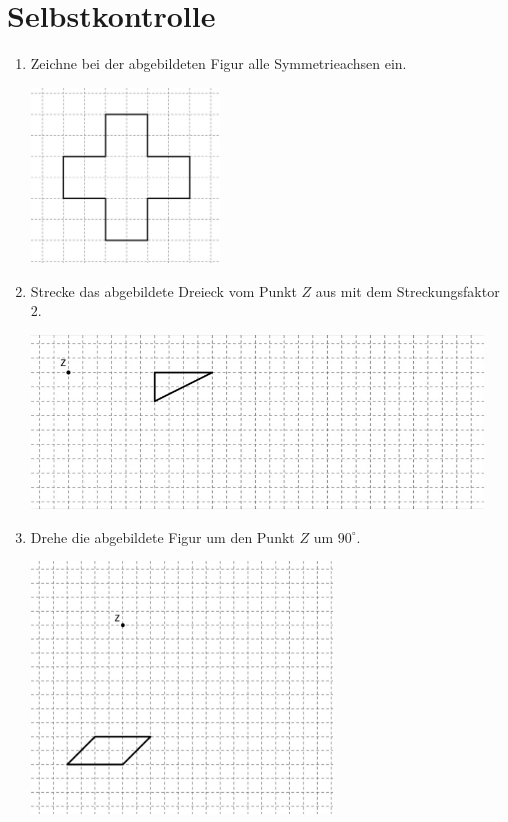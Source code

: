 \documentclass[%
11pt,%
twoside,%
titlepage,%
a4page,%
headsepline%
]{scrartcl}
\begin{document}
\newpage


\section{Selbstkontrolle}
\begin{enumerate}
\item Zeichne bei der abgebildeten Figur alle Symmetrieachsen ein.
\begin{center}
\includegraphics[width=5cm]{pictures/seueb1}
\end{center}
\item Strecke das abgebildete Dreieck vom Punkt $Z$ aus mit dem Streckungsfaktor $2$.
\begin{center}
\includegraphics[width=12cm]{pictures/seueb2}
\end{center}
\item Drehe die abgebildete Figur um den Punkt $Z$ um $90^\circ$.
\begin{center}
\includegraphics[width=8cm]{pictures/seueb3}
\end{center}


\end{enumerate}
\end{document}
